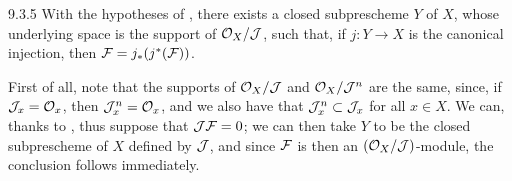 \begin{env}[Corollary]{9.3.5}
\label{cor-1.9.3.5}
With the hypotheses of , there exists a closed subprescheme $Y$ of $X$, whose
underlying space is the support of $\mathcal{O}_X/\mathcal{J}$, such that, if $j\colon Y\to X$ is the canonical
injection, then $\mathcal{F}=j_\ast(j^\ast(\mathcal{F}))$.
\end{env}

First of all, note that the supports of $\mathcal{O}_X/\mathcal{J}$ and $\mathcal{O}_X/\mathcal{J}^n$ are the same,
since, if $\mathcal{J}_x=\mathcal{O}_x$, then $\mathcal{J}_x^n=\mathcal{O}_x$, and we also have that
$\mathcal{J}_x^n\subset\mathcal{J}_x$ for all $x\in X$. We can, thanks to , thus
suppose that $\mathcal{J}\mathcal{F}=0$; we can then take $Y$ to be the closed subprescheme of $X$
defined by $\mathcal{J}$, and since $\mathcal{F}$ is then an $(\mathcal{O}_X/\mathcal{J})$-module, the conclusion
follows immediately.

